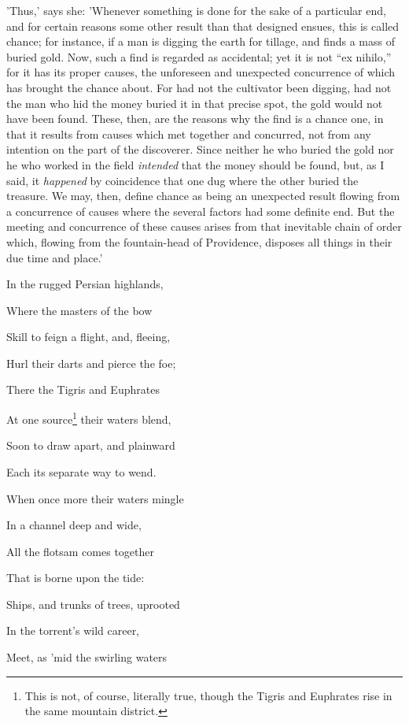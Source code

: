 'Thus,' says she: 'Whenever something is done for the sake of a
particular end, and for certain reasons some other result than that
designed ensues, this is called chance; for instance, if a man is
digging the earth for tillage, and finds a mass of buried gold. Now,
such a find is regarded as accidental; yet it is not ``ex nihilo,'' for it
has its proper causes, the unforeseen and unexpected concurrence of
which has brought the chance about. For had not the cultivator been
digging, had not the man who hid the money buried it in that precise
spot, the gold would not have been found. These, then, are the reasons
why the find is a chance one, in that it results from causes which met
together and concurred, not from any intention on the part of the
discoverer. Since neither he who buried the gold nor he who worked in
the field \emph{intended} that the money should be found, but, as I said, it
\emph{happened} by coincidence that one dug where the other buried the
treasure. We may, then, define chance as being an unexpected result
flowing from a concurrence of causes where the several factors had some
definite end. But the meeting and concurrence of these causes arises
from that inevitable chain of order which, flowing from the
fountain-head of Providence, disposes all things in their due time and
place.'


In the rugged Persian highlands,

Where the masters of the bow

Skill to feign a flight, and, fleeing,

Hurl their darts and pierce the foe;

There the Tigris and Euphrates

At one source\footnote{This is not, of course, literally true, though the Tigris
and Euphrates rise in the same mountain district.} their waters blend,

Soon to draw apart, and plainward

Each its separate way to wend.

When once more their waters mingle

In a channel deep and wide,

All the flotsam comes together

That is borne upon the tide:

Ships, and trunks of trees, uprooted

In the torrent's wild career,

Meet, as 'mid the swirling waters

